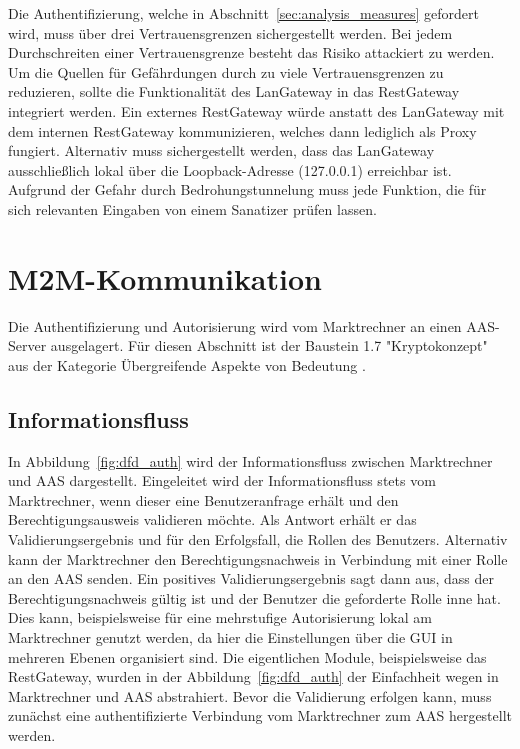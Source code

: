 \documentclass[11pt,a4paper]{report}
\begin{document}
Die Authentifizierung, welche in Abschnitt~\ref{sec:analysis_measures} gefordert wird, muss über drei Vertrauensgrenzen sichergestellt werden. Bei jedem Durchschreiten einer Vertrauensgrenze besteht das Risiko attackiert zu werden. Um die Quellen für Gefährdungen durch zu viele Vertrauensgrenzen zu reduzieren, sollte die Funktionalität des LanGateway in das RestGateway integriert werden. Ein externes RestGateway würde anstatt des LanGateway mit dem internen RestGateway kommunizieren, welches dann lediglich als Proxy fungiert. Alternativ muss sichergestellt werden, dass das LanGateway ausschließlich lokal über die Loopback-Adresse (127.0.0.1) erreichbar ist. Aufgrund der Gefahr durch Bedrohungstunnelung muss jede Funktion, die für sich relevanten Eingaben von einem Sanatizer prüfen lassen.

\section{M2M-Kommunikation} \label{sec:model_auth}

Die Authentifizierung und Autorisierung wird vom Marktrechner an einen AAS-Server ausgelagert. Für diesen Abschnitt ist der Baustein 1.7 "Kryptokonzept" aus der Kategorie Übergreifende Aspekte von Bedeutung \cite{bsi_b1017}.

\subsection{Informationsfluss}

In Abbildung~\ref{fig:dfd_auth} wird der Informationsfluss zwischen Marktrechner und AAS dargestellt. Eingeleitet wird der Informationsfluss stets vom Marktrechner, wenn dieser eine Benutzeranfrage erhält und den Berechtigungsausweis validieren möchte. Als Antwort erhält er das Validierungsergebnis und für den Erfolgsfall, die Rollen des Benutzers. Alternativ kann der Marktrechner den Berechtigungsnachweis in Verbindung mit einer Rolle an den AAS senden. Ein positives Validierungsergebnis sagt dann aus, dass der Berechtigungsnachweis gültig ist und der Benutzer die geforderte Rolle inne hat. Dies kann, beispielsweise für eine mehrstufige Autorisierung lokal am Marktrechner genutzt werden, da hier die Einstellungen über die GUI in mehreren Ebenen organisiert sind. Die eigentlichen Module, beispielsweise das RestGateway, wurden in der Abbildung~\ref{fig:dfd_auth} der Einfachheit wegen in Marktrechner und AAS abstrahiert. Bevor die Validierung erfolgen kann, muss zunächst eine authentifizierte Verbindung vom Marktrechner zum AAS hergestellt werden.
\end{document}
